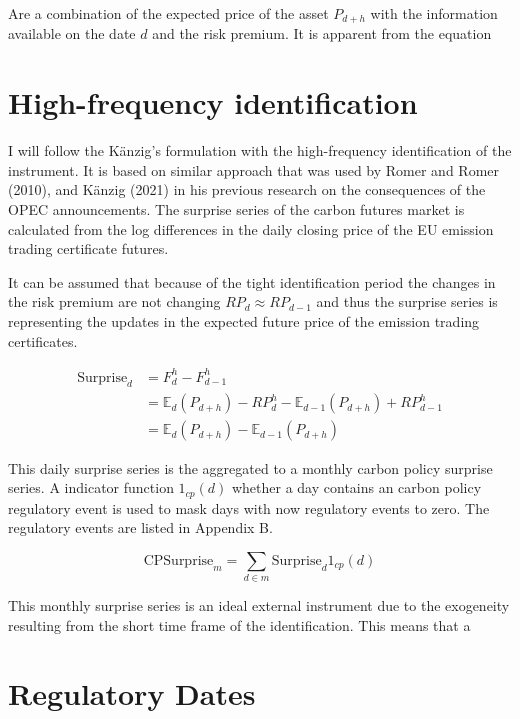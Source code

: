 \documentclass[
  12pt,
  a4paper,
]{report}
\begin{document}
Are a combination of the expected price of the asset \(P_{d+h}\) with the information available on the date \(d\) and the risk premium. It is apparent from the equation

\hypertarget{high-frequency-identification}{%
\section{High-frequency identification}\label{high-frequency-identification}}

I will follow the Känzig's formulation with the high-frequency identification of the instrument. It is based on similar approach that was used by Romer and Romer (2010), and Känzig (2021) in his previous research on the consequences of the OPEC announcements. The surprise series of the carbon futures market is calculated from the log differences in the daily closing price of the EU emission trading certificate futures.

It can be assumed that because of the tight identification period the changes in the risk premium are not changing \(RP_d \approx RP_{d-1}\) and thus the surprise series is representing the updates in the expected future price of the emission trading certificates.

\[
\begin{split}
  \text{Surprise}_d &= F^h_d-F^h_{d-1} \\
  &= \mathbb{E}_d(P_{d+h})-RP^h_d-\mathbb{E}_{d-1}(P_{d+h})+RP^h_{d-1} \\
  &= \mathbb{E}_d(P_{d+h})-\mathbb{E}_{d-1}(P_{d+h}) 
\end{split}
\]

This daily surprise series is the aggregated to a monthly carbon policy surprise series. A indicator function \(1_{cp}(d)\) whether a day contains an carbon policy regulatory event is used to mask days with now regulatory events to zero. The regulatory events are listed in Appendix B.

\[
\text{CPSurprise}_m = \sum_{d\in m}\text{Surprise}_d 1_{cp}(d)
\]

This monthly surprise series is an ideal external instrument due to the exogeneity resulting from the short time frame of the identification. This means that a

\hypertarget{regulatory-dates}{%
\section{Regulatory Dates}\label{regulatory-dates}}
\end{document}
